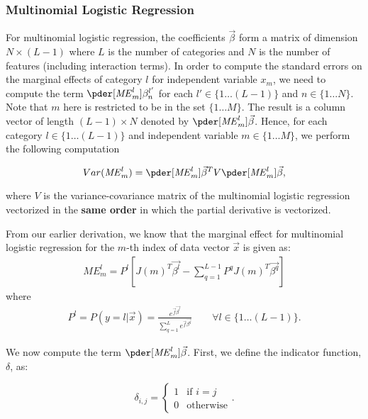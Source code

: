 \subsubsection*{Multinomial Logistic Regression}

For multinomial logistic regression, the coefficients $\vec{\beta}$ form a matrix of
dimension $N \times (L - 1)$ where $L$ is the number of categories and $N$ is the
number of features (including interaction terms). In order to compute the
standard errors on the marginal effects of category $l$ for independent variable
$x_m$, we need to compute the term $\pder[\mathit{ME}_{m}^{l}]{\beta_{n}^{l'}}$
for each $l' \in \{1 \ldots (L-1) \}$ and $n \in \{1 \ldots N \}$. Note that
$m$ here is restricted to be in the set $\{1 \ldots M\}$.
The result is a column vector of length $(L-1) \times N$ denoted by
$\pder[\mathit{ME}_{m}^{l}]{\vec{\beta}}$. Hence, for each category
$l \in \{1 \ldots (L-1)\}$ and independent variable $m \in \{1 \ldots M\}$, we
perform the following computation

\begin{equation}
 Var(\mathit{ME}_m^l) = \pder[\mathit{ME}_m^l]{\vec{\beta}}^T V \pder[\mathit{ME}_m^l]{\vec{\beta}},
\end{equation}

where $V$ is the variance-covariance matrix of the multinomial logistic
regression vectorized in the \textbf{same order} in which the partial derivative
is vectorized.

From our earlier derivation, we know that the marginal effect for multinomial
logistic regression for the $m$-th index of data vector $\vec{x}$ is given as:
\begin{gather*}
  \mathit{ME}_m^l = P^l \left[ J(m)^T \vec{\beta^l} -
                             \sum_{q=1}^{L-1} P^q J(m)^T \vec{\beta^q} \right]
\end{gather*}
where
\begin{gather*}
  P^l = P(y=l| \vec{x}) = \frac{e^{\vec{f}\vec{\beta^l}}}{\displaystyle \sum_{q=1}^{L} e^{\vec{f}\vec{\beta^q}}}
  \qquad \forall l \in \{ 1 \ldots (L-1) \}.
\end{gather*}

We now compute the term $\pder[\mathit{ME}_m^l]{\vec{\beta}}$. First,
we define the indicator function, $\delta$, as:

\begin{equation*}
\delta_{i,j} = \begin{cases} 1 & \mbox{if } i=j \\
                          0 & \mbox{otherwise} \end{cases}.
\end{equation*}

